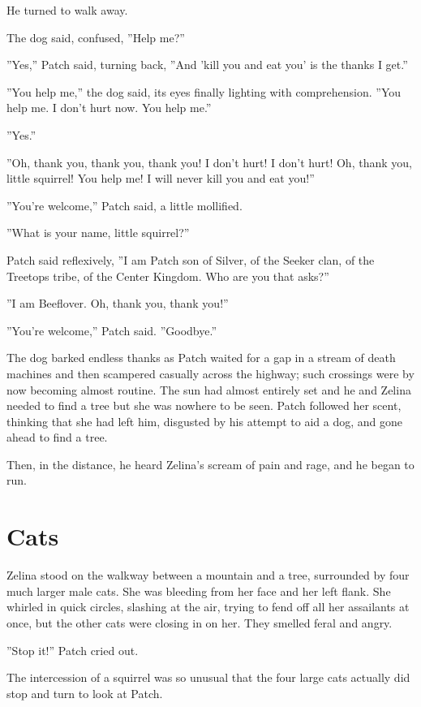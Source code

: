 \documentclass[12pt]{book}
\begin{document}
He turned to walk away.

The dog said, confused, ''Help me?''

''Yes,'' Patch said, turning back, ''And 'kill you and eat you' is the thanks I get.''

''You help me,'' the dog said, its eyes finally lighting with comprehension. ''You help me. I don't hurt now. You help me.''

''Yes.''

''Oh, thank you, thank you, thank you! I don't hurt! I don't hurt! Oh, thank you, little squirrel! You help me! I will never kill you and eat you!''

''You're welcome,'' Patch said, a little mollified.

''What is your name, little squirrel?''

Patch said reflexively, ''I am Patch son of Silver, of the Seeker clan, of the Treetops tribe, of the Center Kingdom. Who are you that asks?''

''I am Beeflover. Oh, thank you, thank you!''

''You're welcome,'' Patch said. ''Goodbye.''

The dog barked endless thanks as Patch waited for a gap in a stream of death machines and then scampered casually across the highway; such crossings were by now becoming almost routine. The sun had almost entirely set and he and Zelina needed to find a tree %
but she was nowhere to be seen. Patch followed her scent, thinking that she had left him, disgusted by his attempt to aid a dog, and gone ahead to find a tree.

Then, in the distance, he heard Zelina's scream of pain and rage, and he began to run.


\section{Cats}

Zelina stood on the walkway between a mountain and a tree, surrounded by four much larger male cats. She was bleeding from her face and her left flank. She whirled in quick circles, slashing at the air, trying to fend off all her assailants at once, but the other cats were closing in on her. They smelled feral and angry.

''Stop it!'' Patch cried out.

The intercession of a squirrel was so unusual that the four large cats actually did stop and turn to look at Patch.
\end{document}
